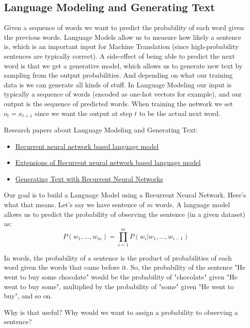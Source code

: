 \documentclass[10pt,a4paper]{ctexbook}
\begin{document}
\subsection{Language Modeling and Generating Text}
Given a sequence of words we want to predict the probability of each word given the previous words. Language Models allow us to measure how likely a sentence is, which is an important input for Machine Translation (since high-probability sentences are typically correct). A side-effect of being able to predict the next word is that we get a generative model, which allows us to generate new text by sampling from the output probabilities. And depending on what our training data is we can generate all kinds of stuff. In Language Modeling our input is typically a sequence of words (encoded as one-hot vectors for example), and our output is the sequence of predicted words. When training the network we set $o_{t} = x_{t+1}$ since we want the output at step $t$ to be the actual next word.

Research papers about Language Modeling and Generating Text:
\begin{itemize}
\item \href{http://www.fit.vutbr.cz/research/groups/speech/publi/2010/mikolov_interspeech2010_IS100722.pdf}{Recurrent neural network based language model}
\item \href{http://www.fit.vutbr.cz/research/groups/speech/publi/2011/mikolov_icassp2011_5528.pdf}{Extensions of Recurrent neural network based language model}
\item \href{http://machinelearning.wustl.edu/mlpapers/paper_files/ICML2011Sutskever_524.pdf}{Generating Text with Recurrent Neural Networks}
\end{itemize}


Our goal is to build a Language Model using a Recurrent Neural Network. Here's what that means. Let's say we have sentence of $m$ words. A language model allows us to predict the probability of observing the sentence (in a given dataset) as:
\[
P(w_{1}, ..., w_{m})=\prod_{i=1}^{m}{P(w_{i}|w_{1},...,w_{i-1})}
\]

In words, the probability of a sentence is the product of probabilities of each word given the words that came before it. So, the probability of the sentence "He went to buy some chocolate" would be the probability of "chocolate" given "He went to buy some", multiplied by the probability of "some" given "He went to buy", and so on.

Why is that useful? Why would we want to assign a probability to observing a sentence?
\end{document}
